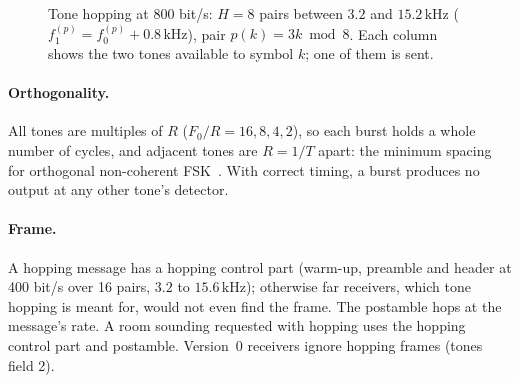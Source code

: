 \documentclass[11pt,a4paper]{article}
\newcommand{\kHz}{\,\mathrm{kHz}}
\theoremstyle{remark}
\begin{document}
\begin{figure}[ht]
\centering
{}
\caption{Tone hopping at 800 bit/s: $H = 8$ pairs between $3.2$ and $15.2\kHz$ ($f_1^{(p)} = f_0^{(p)} + 0.8\kHz$), pair $p(k) = 3k \bmod 8$. Each column shows the two tones available to symbol $k$; one of them is sent.}
\label{fig:hop}
\end{figure}

\paragraph{Orthogonality.}
All tones are multiples of $R$ ($F_0/R = 16, 8, 4, 2$), so each burst holds a whole number of cycles, and adjacent tones are $R = 1/T$ apart: the minimum spacing for orthogonal non-coherent FSK~\cite{proakis}. With correct timing, a burst produces no output at any other tone's detector.

\paragraph{Frame.}
A hopping message has a hopping control part (warm-up, preamble and header at 400 bit/s over 16 pairs, $3.2$ to $15.6\kHz$); otherwise far receivers, which tone hopping is meant for, would not even find the frame. The postamble hops at the message's rate. A room sounding requested with hopping uses the hopping control part and postamble. Version~0 receivers ignore hopping frames (tones field 2).
\end{document}
